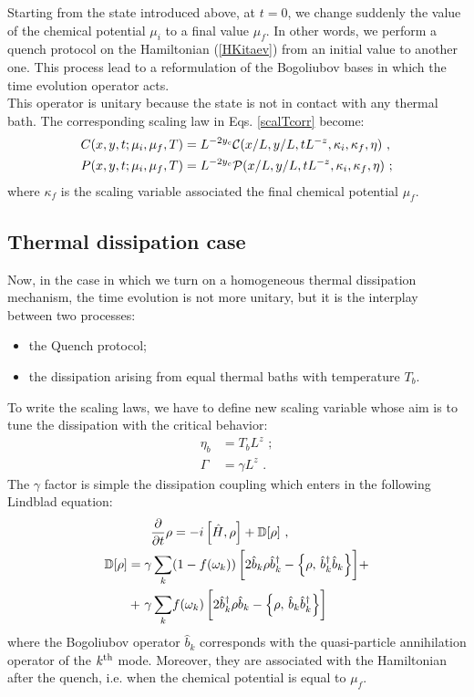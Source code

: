 \documentclass[pra,twocolumn,preprintnumbers,amsmath,amssymb,nofootinbib,floatfix,longbibliography]{revtex4}
\begin{document}
Starting from the state introduced above, at $t=0$, we
change suddenly the value of the chemical potential $\mu_i$
to a final value $\mu_f$. In other words, we perform a
quench protocol on the Hamiltonian (\ref{HKitaev}) from an
initial value to another one. This process lead to a
reformulation of the Bogoliubov bases in which the time
evolution operator acts. \\
This operator is unitary because the state is not in
contact with any thermal bath. The corresponding scaling
law in Eqs. \ref{scalTcorr} become:
\begin{align}
  \label{scalTquench}
  C(x,y,t;\mu_i,\mu_f,T) & = L^{-2y_c} {\cal C}(x/L,y/L,
  tL^{-z},\kappa_i,\kappa_f, \eta) \,\,,\\
  P(x,y,t;\mu_i,\mu_f,T) & = L^{-2y_c} {\cal P}(x/L, y/L,
  tL^{-z},\kappa_i,\kappa_f, \eta) \,\,;
\end{align}
where $\kappa_f$ is the scaling variable associated the
final chemical potential $\mu_f$.\\

\subsection{Thermal dissipation case}

Now, in the case in which we turn on a homogeneous thermal
dissipation mechanism, the time evolution is not more
unitary, but it is the interplay between two processes:
\begin{itemize}
  \item the Quench protocol;
  \item the dissipation arising from equal thermal baths
  with temperature $T_b$.
\end{itemize}
To write the scaling laws, we have to define new scaling
variable whose aim is to tune the dissipation with the
critical behavior:
\begin{align}
	\label{TbScalvar}
	\eta_b & = T_b L^{z} \,\,;\\
	\Gamma & = \gamma L^{z} \,\,.
\end{align}
The $\gamma$ factor is simple the dissipation coupling
which enters in the following Lindblad equation:
\begin{align}
   \label{EQLindblad}
   \frac{\partial}{\partial t} \rho &= -i\,\Bigr[ \hat H,
      \rho \Bigr] + \mathbb{D}[\rho]\,\,,\\
  \mathbb{D}[\rho] = \gamma \sum_k & (1-f(\omega_k))
  \,\biggr[ 2\hat b_{k} \rho \hat b_{k}^\dagger - \Bigl\{
  \rho, \, \hat b_{k}^\dagger \hat b_{k} \Bigl\} \biggr]+
  \notag \\
  + \,\,\gamma \sum _k &
  f(\omega_k)\,\biggr[ 2\hat b_{k}^\dagger \rho \hat b_{k}-
  \Bigl\{ \rho, \, \hat b_{k} \hat b_{k}^\dagger \Bigl\}
  \biggr]
\end{align}
where the Bogoliubov operator $\hat b _k$ corresponds with
the quasi-particle annihilation operator of the
$k^{\rm th}$ mode. Moreover, they are associated with the
Hamiltonian after the quench, i.e. when the chemical
potential is equal to $\mu_f$.
\end{document}
